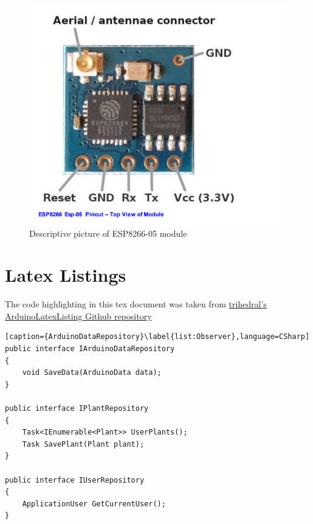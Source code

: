 \documentclass[a4paper,12pt,twoside,openright,titlepage]{book}
\begin{document}
\begin{figure}[!ht]
	\centering
		\includegraphics{ESP8266}
	\caption{Descriptive picture of ESP8266-05 module}
	\label{fig:ESP}
\end{figure}

\chapter{Latex Listings}
The code highlighting in this tex document was taken from \href{https://github.com/trihedral/ArduinoLatexListing/blob/master/arduinoLanguage.tex}{trihedral's ArduinoLatexListing Github repository}



\begin{lstlisting}[caption={ArduinoDataRepository}\label{list:Observer},language=CSharp]
public interface IArduinoDataRepository
{
	void SaveData(ArduinoData data);
}

public interface IPlantRepository
{
	Task<IEnumerable<Plant>> UserPlants();
    Task SavePlant(Plant plant);
} 

public interface IUserRepository
{
	ApplicationUser GetCurrentUser();
}

\end{lstlisting}
\end{document}
